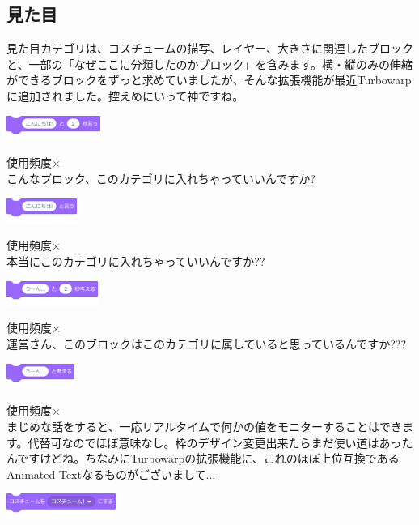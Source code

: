 \documentclass[b5paper,10pt]{jsarticle}
\begin{document}
\begin{multicols*}{3}
\subsection{見た目}
見た目カテゴリは、コスチュームの描写、レイヤー、大きさに関連したブロックと、一部の「なぜここに分類したのかブロック」を含みます。横・縦のみの伸縮ができるブロックをずっと求めていましたが、そんな拡張機能が最近Turbowarpに追加されました。控えめにいって神ですね。

\begin{itembox}{1}
\includegraphics[height=8mm]{images/looks_1.png}
\end{itembox}
使用頻度×\\
こんなブロック、このカテゴリに入れちゃっていいんですか?
\begin{itembox}{2}
\includegraphics[height=8mm]{images/looks_2.png}
\end{itembox}
使用頻度×\\
本当にこのカテゴリに入れちゃっていいんですか??
\begin{itembox}{3}
\includegraphics[height=8mm]{images/looks_3.png}
\end{itembox}
使用頻度×\\
運営さん、このブロックはこのカテゴリに属していると思っているんですか???
\begin{itembox}{4}
\includegraphics[height=8mm]{images/looks_4.png}
\end{itembox}
使用頻度×\\
まじめな話をすると、一応リアルタイムで何かの値をモニターすることはできます。代替可なのでほぼ意味なし。枠のデザイン変更出来たらまだ使い道はあったんですけどね。ちなみにTurbowarpの拡張機能に、これのほぼ上位互換であるAnimated Textなるものがございまして...
\begin{itembox}{5}
\includegraphics[height=8mm]{images/looks_5.png}

\end{itembox}
\end{multicols*}
\end{document}
